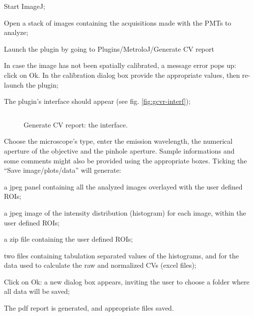 \documentclass[a4paper, 11pt]{report}%
\begin{document}
\begin{enumerate*}
	\item Start ImageJ;
	\item Open a stack of images containing the acquisitions made with the PMTs to analyze;
	\item Launch the plugin by going to Plugins/MetroloJ/Generate CV report
	\item In case the image has not been spatially calibrated, a message error pops up: click on Ok. In the calibration dialog box provide the appropriate values, then re-launch the plugin;
	\item The plugin's interface should appear (see fig. \ref{fig:gcvr-interf}); 
		\begin{figure}[!ht]
			\begin{center}
				\begin{tabular}{c}
				\end{tabular}
			\end{center}
			\caption{\label{fig:gfir-interf}Generate CV report: the interface.}
		\end{figure} 
	\item Choose the microscope's type, enter the emission wavelength, the numerical aperture of the objective and the pinhole aperture. Sample informations and some comments might also be provided using the appropriate boxes. Ticking the ``Save image/plots/data'' will generate:
	\begin{itemize*}
		\item a jpeg panel containing all the analyzed images overlayed with the user defined ROIs;
		\item a jpeg image of the intensity distribution (histogram) for each image, within the user defined ROIs;
		\item a zip file containing the user defined ROIs;
		\item two files containing tabulation separated values of the histograms, and for the data used to calculate the raw and normalized CVs (excel files);
	\end{itemize*}
	\item Click on Ok: a new dialog box appears, inviting the user to choose a folder where all data will be saved;
	\item The pdf report is generated, and appropriate files saved.
\end{enumerate*}

\end{document}

